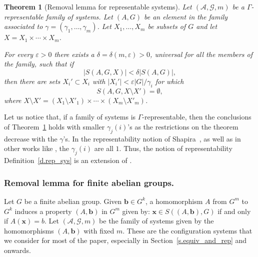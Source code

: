 \documentclass[10pt]{article}
\newtheorem{theorem}{Theorem}
\begin{document}
\begin{theorem}[Removal lemma for representable systems] \label{t.rep_sys_rem_lem}
	Let $(\mathcal{A},\mathcal{G},m)$ be a $\Gamma$-representable family of systems. Let $(A,G)$ be an element in the family associated to $\gamma=(\gamma_1,\ldots,\gamma_m)$. Let $X_1,\ldots,X_m$ be subsets of $G$ and let $X=X_1\times \cdots \times X_m$.
	
	For every $\varepsilon>0$ there exists a $\delta=\delta(m,\varepsilon)>0$, universal for all the members of the family, such that if 
	$$|S(A,G,X)|<\delta |S(A,G)|,$$ 
	then there are sets $X_i'\subset X_i$ with $|X_i'|<\varepsilon |G|/ \gamma_i$ for which $$ S\left(A,G,X\setminus X'\right)=\emptyset,$$ where
$X\setminus X'=(X_1\setminus X'_1)\times \cdots \times (X_m\setminus X'_m)$.
\end{theorem}

 Let us notice that, if 
a family of systems is $\Gamma$-representable, then the conclusions of Theorem~\ref{t.rep_sys_rem_lem} holds with smaller $\gamma_j(i)$'s as the restrictions on the theorem decrease with the $\gamma$'s. In the representability notion of Shapira~\cite{sha10}, as well as in other works like \cite{kraserven09,kraserven12,ksv13}, the $\gamma_j(i)$ are all $1$.
Thus, the notion of representability Definition~\ref{d.rep_sys}
is an extension of \cite[Definition~2.4]{sha10}.



\subsubsection{Removal lemma for finite abelian groups.}

Let $G$ be a finite abelian group. Given $\mathbf{b}\in G^k$, a homomorphism $A$ from $G^m$ to $G^k$ %
induces a property $(A,\mathbf{b})$ in $G^m$ given by: $\mathbf{x}\in S((A,\mathbf{b}),G)$ if and only if $A(\mathbf{x})=b$. Let $(\mathcal{A},\mathcal{G},m)$ be the family of systems given by the homomorphisms $(A,\mathbf{b})$ with fixed $m$. These are the configuration systems
that we consider for most of the paper, especially in Section~\ref{s.equiv_and_rep} and onwards.
\end{document}
